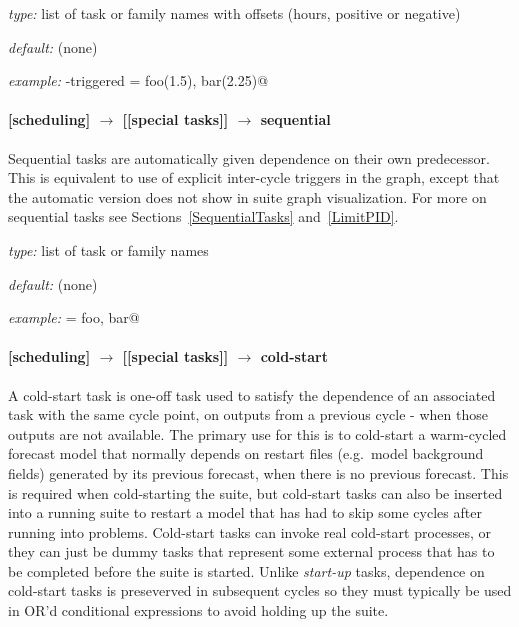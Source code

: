 \begin{myitemize}
    \item {\em type:} list of task or family names with offsets (hours, positive or negative)
    \item {\em default:} (none)
    \item {\em example:} \lstinline@clock-triggered = foo(1.5), bar(2.25)@
\end{myitemize}

\paragraph[sequential]{[scheduling] $\rightarrow$ [[special tasks]] $\rightarrow$ sequential}

Sequential tasks are automatically given dependence on their own
predecessor. This is equivalent to use of explicit inter-cycle triggers
in the graph, except that the automatic version does not show in suite
graph visualization. For more on sequential tasks see
Sections~\ref{SequentialTasks} and~\ref{LimitPID}.

\begin{myitemize}
    \item {\em type:} list of task or family names
    \item {\em default:} (none)
    \item {\em example:} \lstinline@sequential = foo, bar@
\end{myitemize}

\paragraph[cold-start]{[scheduling] $\rightarrow$ [[special tasks]] $\rightarrow$ cold-start}

A cold-start task is one-off task used to satisfy the dependence of an
associated task with the same cycle point, on outputs from a previous
cycle - when those outputs are not available.  The primary use for this
is to cold-start a warm-cycled forecast model that normally depends on
restart files (e.g.\ model background fields) generated by its previous
forecast, when there is no previous forecast.  This is required when
cold-starting the suite, but cold-start tasks can also be inserted into
a running suite to restart a model that has had to skip some cycles
after running into problems. Cold-start tasks can invoke real cold-start
processes, or they can just be dummy tasks that represent some external
process that has to be completed before the suite is started. Unlike
{\em start-up} tasks, dependence on cold-start tasks is preseverved in
subsequent cycles so they must typically be used in OR'd conditional
expressions to avoid holding up the suite.

